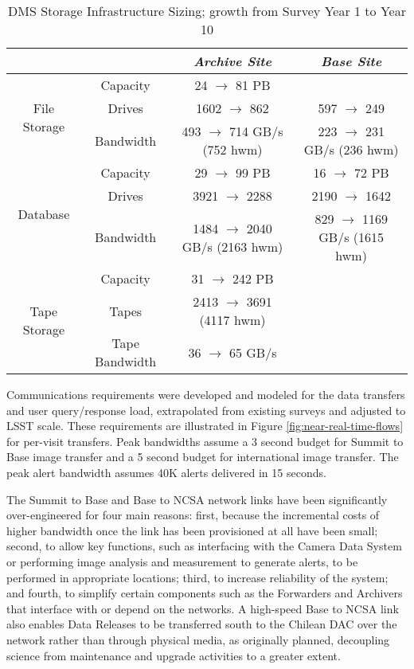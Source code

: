\begin{table}
\centering
\caption{DMS Storage Infrastructure Sizing; growth from Survey Year 1 to Year 10 \label{table:storage-sizing}}
\begin{tabular}{|c|c|c|c|}
\hline
	& & \textit{Archive Site} & \textit{Base Site} \\ \hline
\multirow{3}{*}{File Storage} & Capacity & 24 $\rightarrow$ 81 PB & \\ \cline{2-4}
  & Drives & 1602 $\rightarrow$ 862 & 597 $\rightarrow$ 249 \\ \cline{2-4}
  & Bandwidth & 493 $\rightarrow$ 714 GB/s (752 hwm) & 223 $\rightarrow$ 231 GB/s (236 hwm) \\ \hline
\multirow{3}{*}{Database} & Capacity & 29 $\rightarrow$ 99 PB & 16 $\rightarrow$ 72 PB \\ \cline{2-4}
  & Drives & 3921 $\rightarrow$ 2288 & 2190 $\rightarrow$ 1642 \\ \cline{2-4}
  & Bandwidth & 1484 $\rightarrow$ 2040 GB/s (2163 hwm) & 829 $\rightarrow$ 1169 GB/s (1615 hwm) \\ \hline
\multirow{3}{*}{Tape Storage} & Capacity & 31 $\rightarrow$ 242 PB & \\ \cline{2-4}
  & Tapes & 2413 $\rightarrow$ 3691 (4117 hwm) & \\ \cline{2-4}
  & Tape Bandwidth & 36 $\rightarrow$ 65 GB/s & \\ \hline
\end{tabular}
\end{table}


Communications requirements were developed and modeled for the data transfers
and user query/response load, extrapolated from existing surveys and adjusted
to LSST scale.  These requirements are illustrated in Figure
\ref{fig:near-real-time-flows} for per-visit transfers.  Peak bandwidths assume
a 3 second budget for Summit to Base image transfer and a 5 second budget for
international image transfer.
The peak alert bandwidth assumes 40K alerts delivered in 15 seconds.

The Summit to Base and Base to NCSA network links have been significantly
over-engineered for four main reasons: first, because the incremental costs of
higher bandwidth once the link has been provisioned at all have been small;
second, to allow key functions, such as interfacing with the Camera Data System
or performing image analysis and measurement to generate alerts, to be
performed in appropriate locations; third, to increase reliability of the
system; and fourth, to simplify certain components such as the Forwarders and
Archivers that interface with or depend on the networks.  A high-speed Base to
NCSA link also enables Data Releases to be transferred south to the Chilean DAC
over the network rather than through physical media, as originally planned,
decoupling science from maintenance and upgrade activities to a greater extent.

